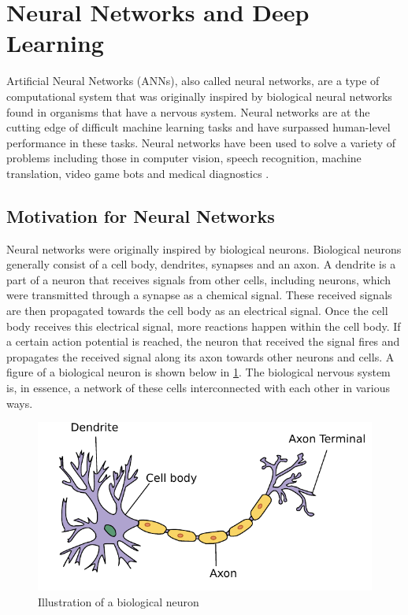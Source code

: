 
\section{Neural Networks and Deep Learning}

Artificial Neural Networks (ANNs), also called neural networks, are a type of computational system that was originally inspired by biological neural networks found in organisms that have a nervous system. Neural networks are at the cutting edge of difficult machine learning tasks and have surpassed human-level performance in these tasks. Neural networks have been used to solve a variety of problems including those in computer vision, speech recognition, machine translation, video game bots and medical diagnostics \cite{imagenet_cnn,acoustic_modeling_speech,neural_translation,atari_deep_reinforcement_learning,3d_conf_for_alzheimers}.

\subsection{Motivation for Neural Networks}

Neural networks were originally inspired by biological neurons. Biological neurons generally consist of a cell body, dendrites, synapses and an axon. A dendrite is a part of a neuron that receives signals from other cells, including neurons, which were transmitted through a synapse as a chemical signal. These received signals are then propagated towards the cell body as an electrical signal. Once the cell body receives this electrical signal, more reactions happen within the cell body. If a certain action potential is reached, the neuron that received the signal fires and propagates the received signal along its axon towards other neurons and cells. A figure of a biological neuron is shown below in \cref{fig:bioneuron}. The biological nervous system is, in essence, a network of these cells interconnected with each other in various ways. 

\begin{figure}[!ht]
	\centering
	\includegraphics[height=0.35\linewidth]{pictures/Neuron.pdf}
	\caption[Illustration of a biological neuron]{Illustration of a biological neuron\cite{wiki:neuronpic}}\label{fig:bioneuron}  
\end{figure}

